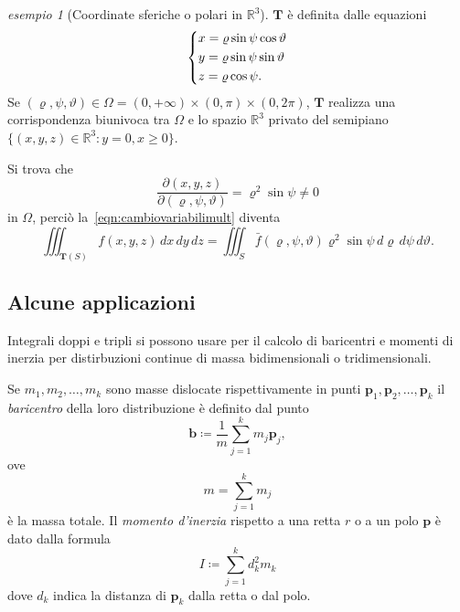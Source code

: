 \documentclass[a4paper]{book}
\numberwithin{equation}{section}
\renewcommand{\theta}{\vartheta}
\renewcommand{\rho}{\varrho}
\theoremstyle{plain}
\theoremstyle{definition}
\theoremstyle{remark}
\renewcommand{\vec}{\boldsymbol}
\theoremstyle{example}
\newtheorem{exmp}{esempio}[section]
\begin{document}
	\begin{exmp}[Coordinate sferiche o polari in $\mathbb{R}^3$] $\vec{T}$ è definita dalle equazioni
			\begin{equation}
				\begin{dcases}
					x = \rho\sin\psi\cos\theta \\
					y = \rho\sin\psi\sin\theta \\
					z = \rho\cos\psi.
				\end{dcases}
			\end{equation}
	Se $(\rho, \psi, \theta) \in \Omega = (0, +\infty) \times (0, \pi) \times (0, 2\pi)$, $\vec{T}$ realizza una corrispondenza biunivoca tra $\Omega$ e lo spazio $\mathbb{R}^3$ privato del semipiano $\{(x, y, z) \in \mathbb{R}^3 \colon y = 0, x \ge 0\}$.

	Si trova che
		\begin{equation*}
			\frac{\partial (x, y, z)}{\partial (\rho, \psi, \theta)} = \rho^2\sin\psi \ne 0
		\end{equation*}
	in $\Omega$, perciò la~\eqref{eqn:cambiovariabilimult} diventa
		\begin{equation*}
			\iiint_{\vec{T}(S)}f(x, y, z)\,dx\,dy\,dz = \iiint_S \bar{f}(\rho, \psi, \theta)\rho^2\sin\psi\,d\rho\,d\psi\,d\theta.
		\end{equation*}

	\end{exmp}

	\subsection{Alcune applicazioni}
	Integrali doppi e tripli si possono usare per il calcolo di baricentri e momenti di inerzia per distirbuzioni continue di massa bidimensionali o tridimensionali.

	Se $m_1, m_2, \dots, m_k$ sono masse dislocate rispettivamente in punti $\vec{p}_1, \vec{p}_2, \dots, \vec{p}_k$ il \emph{baricentro} della loro distribuzione è definito dal punto
		\begin{equation*}
			\vec{b} \coloneqq \frac{1}{m}\sum_{j = 1}^k m_j\vec{p}_j,
		\end{equation*}
ove
	\begin{equation*}
		m = \sum_{j=1}^km_j
	\end{equation*}
è la massa totale. Il \emph{momento d'inerzia} rispetto a una retta $r$ o a un polo $\vec{p}$ è dato dalla formula
	\begin{equation*}
		I \coloneqq \sum_{j=1}^k d_k^2m_k
	\end{equation*}
dove $d_k$ indica la distanza di $\vec{p}_k$ dalla retta o dal polo.
\end{document}
